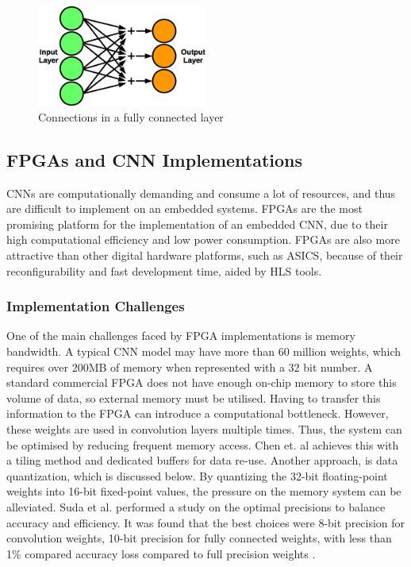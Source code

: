 \documentclass[12pt]{article}
\begin{document}
\begin{figure} [H]
\centering
\includegraphics[width=0.5\textwidth]{figures/fc.eps}
\caption{Connections in a fully connected layer}
\label{fig:fc}
\end{figure}

\subsection{FPGAs and CNN Implementations}
\label{sec:Background-FpgaCnnImpl}


CNNs are computationally demanding and consume a lot of resources, and thus are difficult to implement on an embedded systems. FPGAs are the most promising platform for the implementation of an embedded CNN, due to their high computational efficiency and low power consumption. FPGAs are also more attractive than other digital hardware platforms, such as ASICS, because of their reconfigurability and fast development time, aided by HLS tools.

\subsubsection{Implementation Challenges}
\label{sec:Background-FpgaCnnImpl-Challenges}


One of the main challenges faced by FPGA implementations is memory bandwidth. A typical CNN model may have more than 60 million weights, which requires over 200MB of memory when represented with a 32 bit number. A standard commercial FPGA does not have enough on-chip memory to store this volume of data, so external memory must be utilised. Having to transfer this information to the FPGA can introduce a computational bottleneck. However, these weights are used in convolution layers multiple times. Thus, the system can be optimised by reducing frequent memory access. Chen et. al achieves this with a tiling method and dedicated buffers for data re-use. Another approach, is data quantization, which is discussed below. By quantizing the 32-bit floating-point weights into 16-bit fixed-point values, the pressure on the memory system can be alleviated. Suda et al. performed a study on the optimal precisions to balance accuracy and efficiency. It was found that the best choices were 8-bit precision for convolution weights, 10-bit precision for fully connected weights, with less than 1\% compared accuracy loss compared to full precision weights \cite{SudaFpgaAccelerator}.
\end{document}
